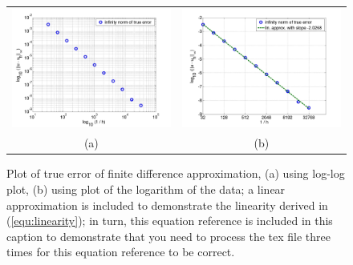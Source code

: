 \documentclass[12pt]{article}
\numberwithin{equation}{section}
\numberwithin{table}{section}
\numberwithin{figure}{section}
\newlength{\fwtwo} \setlength{\fwtwo}{0.45\textwidth}
\begin{document}
\begin{figure} \centering
  \begin{tabular}{cc}
    \includegraphics[width=\fwtwo]{figconvrateloglog} &
    \includegraphics[width=\fwtwo]{figconvrateplot} \\
    (a) & (b)
  \end{tabular}
  \caption{Plot of true error of finite difference approximation,
  (a) using log-log plot, (b) using plot of the logarithm of the data;
  a linear approximation is included to demonstrate the linearity
  derived in (\ref{equ:linearity}); in turn, this equation reference
  is included in this caption to demonstrate that you need to process
  the tex file three times for this equation reference to be correct.}
  \label{fig:convrateab}
\end{figure}
\end{document}
